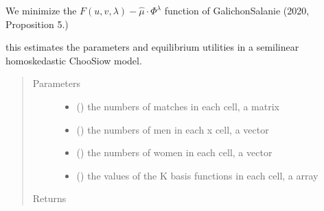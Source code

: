 \documentclass[letterpaper,10pt,english]{sphinxmanual}
\begin{document}
We minimize the \(F(u,v,\lambda)-\hat{\mu}\cdot \Phi^{\lambda}\) function of Galichon\textendash{}Salanie (2020, Proposition 5.)

\begin{fulllineitems}
\label{\detokenize{estimate_cs_fuvl:estimate_cs_fuvl.estimate_cs_fuvl}}
this estimates the parameters and equilibrium utilities in a semilinear homoskedastic Choo\sphinxhyphen{}Siow model.
\begin{quote}\begin{description}
\item[{Parameters}] \leavevmode\begin{itemize}
\item {} 
 () \textendash{} the numbers of matches in each  cell, a  matrix

\item {} 
 () \textendash{} the numbers of men in each x cell, a \sphinxhyphen{}vector

\item {} 
 () \textendash{} the numbers of women in each  cell, a \sphinxhyphen{}vector

\item {} 
 () \textendash{} the values of the K basis functions in each cell, a  array

\end{itemize}

\item[{Returns}] \leavevmode


\end{description}
\end{quote}
\end{fulllineitems}
\end{document}
